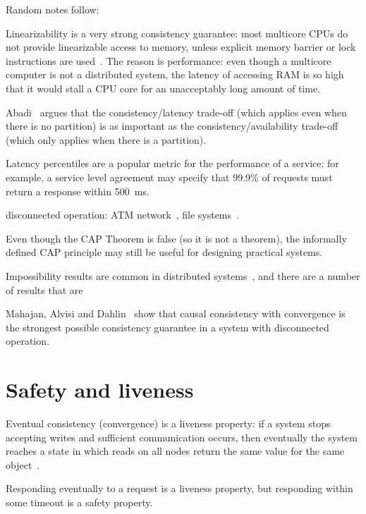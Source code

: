 \documentclass[a4paper,twocolumn,10pt]{article}
\begin{document}
Random notes follow:

Linearizability is a very strong consistency guarantee: most multicore CPUs do not provide
linearizable access to memory, unless explicit memory barrier or lock instructions are
used~\cite{Sewell2010fj}. The reason is performance: even though a multicore computer is not a
distributed system, the latency of accessing RAM is so high that it would stall a CPU core for an
unacceptably long amount of time.

Abadi~\cite{Abadi2012hb} argues that the consistency/latency trade-off (which applies even when
there is no partition) is as important as the consistency/availability trade-off (which only applies
when there is a partition).

Latency percentiles are a popular metric for the performance of a service: for example, a service
level agreement may specify that 99.9\% of requests must return a response within 500~ms.

disconnected operation: ATM network~\cite{Brewer2012tr}, file systems~\cite{Kistler1992bt}.


Even though the CAP Theorem is false (so it is not a theorem), the informally defined CAP principle
may still be useful for designing practical systems.

Impossibility results are common in distributed systems~\cite{Lynch1989kj}, and there are a number
of results that are 

\cite{Attiya1995bm}
\cite{Fischer1985tt}

Mahajan, Alvisi and Dahlin~\cite{Mahajan2011wz} show that causal consistency with convergence is the
strongest possible consistency guarantee in a system with disconnected operation.


\section{Safety and liveness}

Eventual consistency (convergence) is a liveness property: if a system stops accepting writes and
sufficient communication occurs, then eventually the system reaches a state in which reads on all
nodes return the same value for the same object~\cite{Mahajan2011wz}.

Responding eventually to a request is a liveness property, but responding within some timeout is a
safety property.

{\footnotesize

{}}
\end{document}
